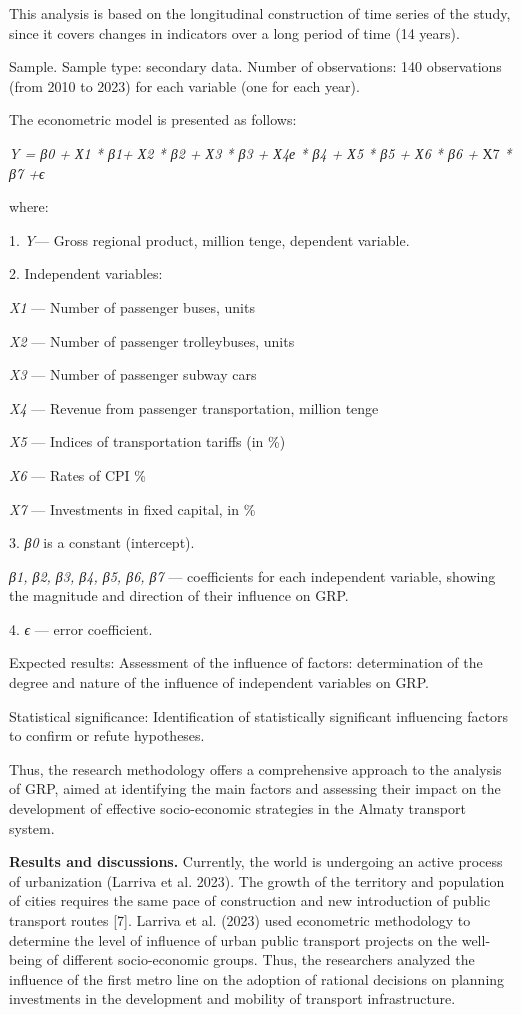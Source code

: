 This analysis is based on the longitudinal construction of time series
of the study, since it covers changes in indicators over a long period
of time (14 years).

Sample. Sample type: secondary data. Number of observations: 140
observations (from 2010 to 2023) for each variable (one for each year).

The econometric model is presented as follows:

\emph{Y = β0 + Х1 * β1+ Х2 * β2 + Х3 * β3 + Х4е * β4 + Х5 * β5 + Х6 * β6
+} Х7 \emph{* β7 +ϵ}

where:

1. \emph{Y}--- Gross regional product, million tenge, dependent
variable.

2. Independent variables:

\emph{X1} --- Number of passenger buses, units

\emph{X2} --- Number of passenger trolleybuses, units

\emph{X3} --- Number of passenger subway cars

\emph{X4} --- Revenue from passenger transportation, million tenge

\emph{X5} --- Indices of transportation tariffs (in \%)

\emph{X6} --- Rates of CPI \%

\emph{X7} --- Investments in fixed capital, in \%

3. \emph{β0} is a constant (intercept).

\emph{β1, β2, β3, β4, β5, β6, β7} --- coefficients for each independent
variable, showing the magnitude and direction of their influence on GRP.

4. \emph{ϵ} --- error coefficient.

Expected results: Assessment of the influence of factors: determination
of the degree and nature of the influence of independent variables on
GRP.

Statistical significance: Identification of statistically significant
influencing factors to confirm or refute hypotheses.

Thus, the research methodology offers a comprehensive approach to the
analysis of GRP, aimed at identifying the main factors and assessing
their impact on the development of effective socio-economic strategies
in the Almaty transport system.

{\bfseries Results and discussions.} Currently, the world is undergoing an
active process of urbanization (Larriva et al. 2023). The growth of the
territory and population of cities requires the same pace of
construction and new introduction of public transport routes {[}7{]}.
Larriva et al. (2023) used econometric methodology to determine the
level of influence of urban public transport projects on the well-being
of different socio-economic groups. Thus, the researchers analyzed the
influence of the first metro line on the adoption of rational decisions
on planning investments in the development and mobility of transport
infrastructure.

